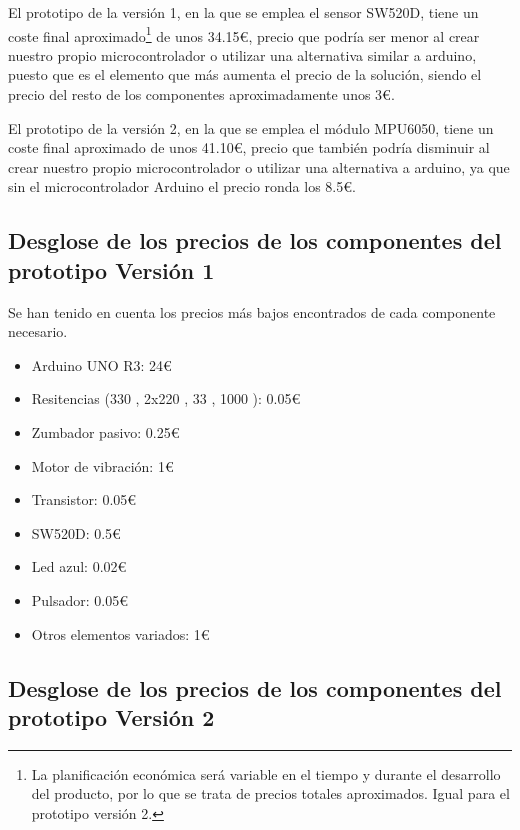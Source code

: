 El prototipo de la versión 1, en la que se emplea el sensor SW520D, tiene un coste final aproximado\footnote{La planificación económica será variable en el tiempo y durante el desarrollo del producto, por lo que se trata de precios totales aproximados. Igual para el prototipo versión 2.} de unos 34.15€, precio que podría ser menor al crear nuestro propio microcontrolador o utilizar una alternativa similar a arduino, puesto que es el elemento que más aumenta el precio de la solución, siendo el precio del resto de los componentes aproximadamente unos 3€.

El prototipo de la versión 2, en la que se emplea el módulo MPU6050, tiene un coste final aproximado de unos 41.10€, precio que también podría disminuir al crear nuestro propio microcontrolador o utilizar una alternativa a arduino, ya que sin el microcontrolador Arduino el precio ronda los 8.5€.


\subsection{Desglose de los precios de los componentes del prototipo Versión 1}

Se han tenido en cuenta los precios más bajos encontrados de cada componente necesario.
\begin{itemize}
    \item Arduino UNO R3: 24€
    \item Resitencias (330 \textOmega, 2x220 \textOmega, 33 \textOmega, 1000 \textOmega): 0.05€
    \item Zumbador pasivo: 0.25€
    \item Motor de vibración: 1€
    \item Transistor: 0.05€
    \item SW520D: 0.5€
    \item Led azul: 0.02€
    \item Pulsador: 0.05€
    \item Otros elementos variados: 1€
    
\end{itemize}

\subsection{Desglose de los precios de los componentes del prototipo Versión 2}

